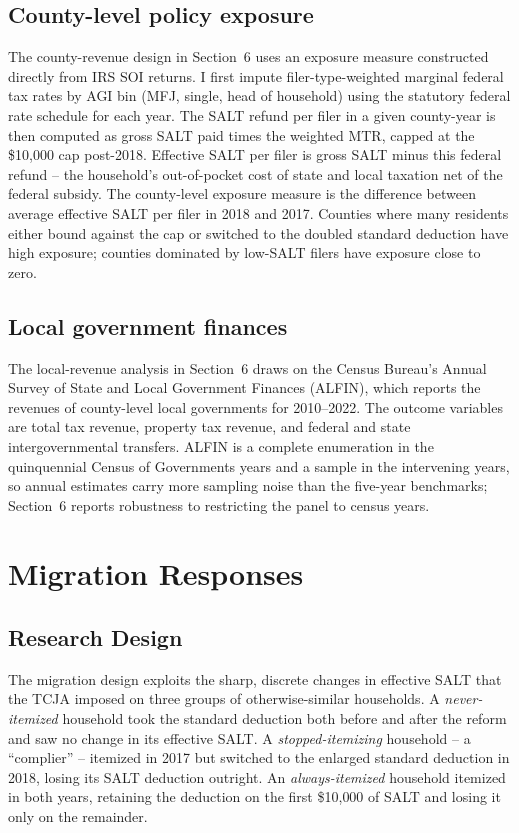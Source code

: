 \documentclass[12pt]{article}
\begin{document}
\subsection*{County-level policy exposure}

The county-revenue design in Section~6 uses an exposure measure constructed directly from IRS SOI returns. I first impute filer-type-weighted marginal federal tax rates by AGI bin (MFJ, single, head of household) using the statutory federal rate schedule for each year. The SALT refund per filer in a given county-year is then computed as gross SALT paid times the weighted MTR, capped at the \$10{,}000 cap post-2018. Effective SALT per filer is gross SALT minus this federal refund -- the household's out-of-pocket cost of state and local taxation net of the federal subsidy. The county-level exposure measure is the difference between average effective SALT per filer in 2018 and 2017. Counties where many residents either bound against the cap or switched to the doubled standard deduction have high exposure; counties dominated by low-SALT filers have exposure close to zero.

\subsection*{Local government finances}

The local-revenue analysis in Section~6 draws on the Census Bureau's Annual Survey of State and Local Government Finances (ALFIN), which reports the revenues of county-level local governments for 2010--2022. The outcome variables are total tax revenue, property tax revenue, and federal and state intergovernmental transfers. ALFIN is a complete enumeration in the quinquennial Census of Governments years and a sample in the intervening years, so annual estimates carry more sampling noise than the five-year benchmarks; Section~6 reports robustness to restricting the panel to census years.


\section{Migration Responses}

\subsection*{Research Design}

The migration design exploits the sharp, discrete changes in effective SALT that the TCJA imposed on three groups of otherwise-similar households. A \emph{never-itemized} household took the standard deduction both before and after the reform and saw no change in its effective SALT. A \emph{stopped-itemizing} household -- a ``complier'' -- itemized in 2017 but switched to the enlarged standard deduction in 2018, losing its SALT deduction outright. An \emph{always-itemized} household itemized in both years, retaining the deduction on the first \$10{,}000 of SALT and losing it only on the remainder.
\end{document}
